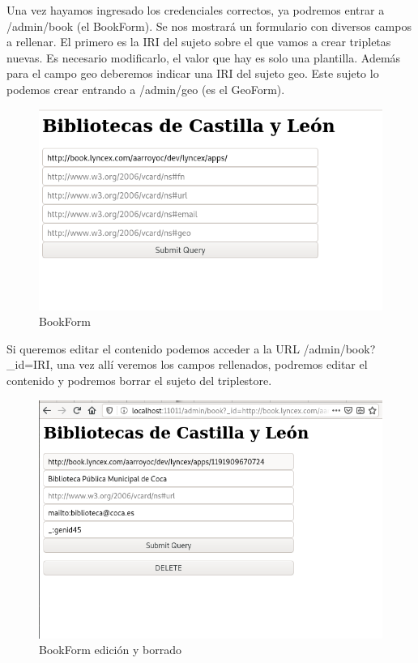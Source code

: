 \documentclass[12pt]{report} %
\begin{document}
Una vez hayamos ingresado los credenciales correctos, ya podremos entrar a /admin/book (el BookForm). Se nos mostrará un formulario con diversos campos a rellenar. El primero es la IRI del sujeto sobre el que vamos a crear tripletas nuevas. Es necesario modificarlo, el valor que hay es solo una plantilla. Además para el campo geo deberemos indicar una IRI del sujeto geo. Este sujeto lo podemos crear entrando a /admin/geo (es el GeoForm).

\begin{figure}
    \centering
    \includegraphics{tour/bibliocyl5.png}
    \caption{BookForm}
    \label{fig:bibliocyl5}
\end{figure}

Si queremos editar el contenido podemos acceder a la URL /admin/book?_id=IRI, una vez allí veremos los campos rellenados, podremos editar el contenido y podremos borrar el sujeto del triplestore.

\begin{figure}
    \centering
    \includegraphics[width=\textwidth]{tour/bibliocyl7.png}
    \caption{BookForm edición y borrado}
    \label{fig:bibliocyl7}
\end{figure}
\end{document}
